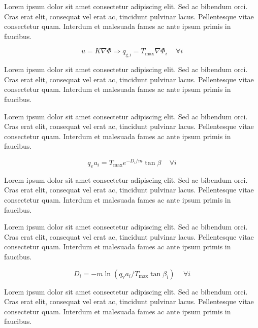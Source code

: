 \documentclass[./main.tex]{subfiles}
\begin{document}
\par Lorem ipsum dolor sit amet consectetur adipiscing elit. Sed ac bibendum orci. Cras erat elit, consequat vel erat ac, tincidunt pulvinar lacus. Pellentesque vitae consectetur quam. Interdum et malesuada fames ac ante ipsum primis in faucibus.
\begin{linenomath*}
\begin{equation}
\label{eq:topmodel:darcy1}
u = K \nabla \Phi \Rightarrow q_{\text{g,i}} = T_{\text{max}} \nabla \Phi_{i} \quad \, \forall i
\end{equation}
\end{linenomath*}
Lorem ipsum dolor sit amet consectetur adipiscing elit. Sed ac bibendum orci. Cras erat elit, consequat vel erat ac, tincidunt pulvinar lacus. Pellentesque vitae consectetur quam. Interdum et malesuada fames ac ante ipsum primis in faucibus.

\par Lorem ipsum dolor sit amet consectetur adipiscing elit. Sed ac bibendum orci. Cras erat elit, consequat vel erat ac, tincidunt pulvinar lacus. Pellentesque vitae consectetur quam. Interdum et malesuada fames ac ante ipsum primis in faucibus.
\begin{linenomath*}
\begin{equation}
\label{eq:topmodel:darcy2}
q_{\text{v}} a_{i} = T_{\text{max}} e^{-D_{i}/m} \tan \beta  \quad \, \forall i
\end{equation}
\end{linenomath*}
Lorem ipsum dolor sit amet consectetur adipiscing elit. Sed ac bibendum orci. Cras erat elit, consequat vel erat ac, tincidunt pulvinar lacus. Pellentesque vitae consectetur quam. Interdum et malesuada fames ac ante ipsum primis in faucibus.

\par Lorem ipsum dolor sit amet consectetur adipiscing elit. Sed ac bibendum orci. Cras erat elit, consequat vel erat ac, tincidunt pulvinar lacus. Pellentesque vitae consectetur quam. Interdum et malesuada fames ac ante ipsum primis in faucibus.
\begin{linenomath*}
\begin{equation}
\label{eq:topmodel:darcy3}
D_{i} = -m \ln{(q_{\text{v}} a_{i} /T_{\text{max}}\tan \beta_{i})}  \quad \, \forall i
\end{equation}
\end{linenomath*}
Lorem ipsum dolor sit amet consectetur adipiscing elit. Sed ac bibendum orci. Cras erat elit, consequat vel erat ac, tincidunt pulvinar lacus. Pellentesque vitae consectetur quam. Interdum et malesuada fames ac ante ipsum primis in faucibus.
\end{document}
